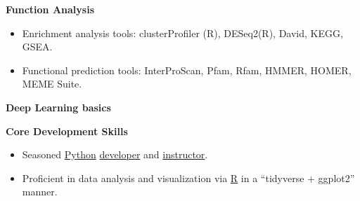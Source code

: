 \textbf{Function Analysis}
\begin{itemize}
    \item Enrichment analysis tools: clusterProfiler (R), DESeq2(R), David, KEGG, GSEA.
    \item Functional prediction tools: InterProScan, Pfam, Rfam, HMMER, HOMER, MEME Suite.
\end{itemize}
\textbf{Deep Learning basics}


\textbf{Core Development Skills}\\

\begin{itemize}
    \item Seasoned \underline{Python} \href{https://github.com/hermanzhaozzzz}{developer} and \href{https://www.bioinfo.info/p/t_pc/goods_pc_detail/goods_detail/course_2SvfNlIVzrKfOcexHk9Nute5Bhd}{instructor}.
    \item Proficient in data analysis and visualization via \underline{R} in a ``tidyverse + ggplot2'' manner.
\end{itemize}
  
  
  
